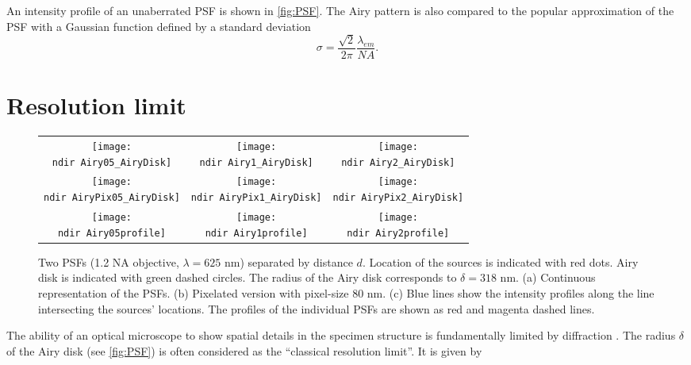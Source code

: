 An intensity profile of an unaberrated PSF is shown in \autoref{fig:PSF}. The Airy pattern is also compared to the popular approximation of the PSF with a Gaussian function \cite{Zhang2007} defined by a standard deviation
%
\begin{equation}
	\sigma=\frac{\sqrt{2}}{2\pi}\frac{\lambda_{em}}{\unit{NA}}.
\end{equation}


\section{Resolution limit \label{sec:Resolution limit}}

\begin{figure}[!bht]
	\centering
	\newcommand{\wf}{.3\textwidth}	
	\newcommand{\ndir}{figures/psfillustration/}
	\begin{tabular}{ccc}
		\subfloat[$d=\delta/2$]{\texttt{[image: \\ndir Airy05\_AiryDisk]}}
		& \subfloat[$d=\delta$]{\texttt{[image: \\ndir Airy1\_AiryDisk]}}
		& \subfloat[$d=2\delta$]{\texttt{[image: \\ndir Airy2\_AiryDisk]}}
		\tabularnewline
		\subfloat[$d=\delta/2$]{\texttt{[image: \\ndir AiryPix05\_AiryDisk]}}
		& \subfloat[$d=\delta$]{\texttt{[image: \\ndir AiryPix1\_AiryDisk]}}
		& \subfloat[$d=2\delta$]{\texttt{[image: \\ndir AiryPix2\_AiryDisk]}}
		\tabularnewline
		\subfloat[$d=\delta/2$]{\texttt{[image: \\ndir Airy05profile]}}
		& \subfloat[$d=\delta$]{\texttt{[image: \\ndir Airy1profile]}}
		& \subfloat[$d=2\delta$]{\texttt{[image: \\ndir Airy2profile]}}
		\tabularnewline
	\end{tabular}
	\caption{Two PSFs (1.2 NA objective, $\lambda=625$ nm) separated by distance $d$. Location of the sources is indicated with red dots. Airy disk is indicated with green dashed circles. The radius of the Airy disk corresponds to $\delta=318$ nm. (a) Continuous representation of the PSFs. (b) Pixelated version with pixel-size 80 nm. (c) Blue lines show the intensity profiles along the line intersecting the sources' locations. The profiles of the individual PSFs are shown as red and magenta dashed lines.}
	\label{fig:Rayleigh}
\end{figure}
%
The ability of an optical microscope to show spatial details in the specimen structure is fundamentally limited by diffraction \cite{Born1999}. The radius $\delta$ of the Airy disk (see \autoref{fig:PSF}) is often considered as the ``classical resolution limit''. It is given by \cite{Born1999}
